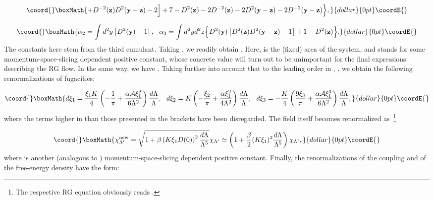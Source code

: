 \documentclass[a4paper,12pt]{article}
\begin{document}
$$\coord{}\boxMath{+D^{-2}({\bf z})D^2({\bf y}-{\bf z})-2\Bigr]+7-
D^2({\bf z})-2D^{-2}({\bf z})-2D^2({\bf y}-{\bf z})-2D^{-2}({\bf y}-{\bf z})\Bigr\},}{dollar}{0pt}\coordE{}$$

$$\coord{}\boxMath{
\alpha_2=\int d^2y\left[D^2({\bf y})-1\right],~~
\alpha_3=\int d^2yd^2z\Bigl\{D^2({\bf y})\left[D^2({\bf z})D^2({\bf y}-{\bf z})-1\right]+1-D^2({\bf z})\Bigr\}.}{dollar}{0pt}\coordE{}$$
The constants \coordHE{} here stem from the third cumulant. Taking \coordHE{}, we readily obtain
\coordHE{}. Here,
\coordHE{} is the (fixed) area of the system, and \myHighlight{$\alpha$}\coordHE{}
stands for some momentum-space-slicing dependent positive constant,
whose concrete value will turn out to be unimportant for the final expressions describing the
RG flow. In the same way, we have \coordHE{}. Taking further into account that
to the leading order in \coordHE{}, \coordHE{}, we obtain the
following renormalizations of fugacities:

$$\coord{}\boxMath{
d\xi_1=\frac{\xi_1K}{4}\left(-\frac{1}{\pi}+\frac{\alpha{\cal A}\xi_1^2}{6\Lambda^2}\right)\frac{d\Lambda}{\Lambda},~~
d\xi_2=K\left(-\frac{\xi_2}{\pi}+\frac{\alpha \xi_1^2}{4\Lambda^2}\right)\frac{d\Lambda}{\Lambda},~~
d\xi_3=-\frac{K}{4}\left(\frac{9\xi_3}{\pi}+\frac{\alpha{\cal A}\xi_1^3}{6\Lambda^2}\right)\frac{d\Lambda}{\Lambda},}{dollar}{0pt}\coordE{}$$
where the terms higher in \coordHE{} than those presented in the brackets have been disregarded.
The field itself becomes renormalized as~\footnote{The respective RG equation obviously reads \coordHE{}.}

$$\coord{}\boxMath{\chi_{\Lambda'}^{\rm new}=\sqrt{1+\beta\left(K\xi_1D(0)\right)^2\frac{d\Lambda}{\Lambda^5}}\chi_{\Lambda'}\simeq
\left(1+\frac{\beta}{2}(K\xi_1)^2\frac{d\Lambda}{\Lambda^5}\right)\chi_{\Lambda'},}{dollar}{0pt}\coordE{}$$
where \myHighlight{$\beta$}\coordHE{} is another (analogous to \myHighlight{$\alpha$}\coordHE{})
momentum-space-slicing dependent positive constant. Finally, the renormalizations of the coupling \coordHE{} and of the free-energy density
\coordHE{} have the form:
\end{document}
